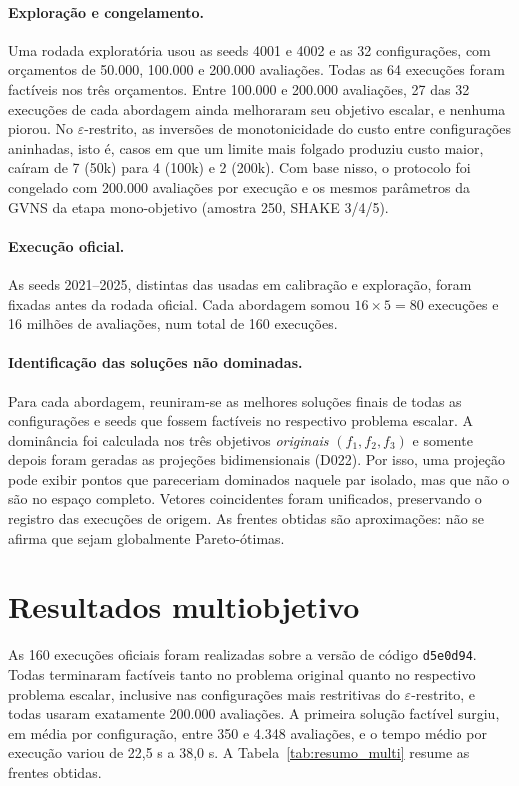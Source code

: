 \documentclass[10pt,twocolumn,a4paper]{article}
\begin{document}
\paragraph{Exploração e congelamento.} Uma rodada exploratória usou as seeds 4001 e 4002 e as 32 configurações, com orçamentos de 50.000, 100.000 e 200.000 avaliações. Todas as 64 execuções foram factíveis nos três orçamentos. Entre 100.000 e 200.000 avaliações, 27 das 32 execuções de cada abordagem ainda melhoraram seu objetivo escalar, e nenhuma piorou. No $\varepsilon$-restrito, as inversões de monotonicidade do custo entre configurações aninhadas, isto é, casos em que um limite mais folgado produziu custo maior, caíram de 7 (50k) para 4 (100k) e 2 (200k). Com base nisso, o protocolo foi congelado com 200.000 avaliações por execução e os mesmos parâmetros da GVNS da etapa mono-objetivo (amostra 250, SHAKE 3/4/5).

\paragraph{Execução oficial.} As seeds 2021--2025, distintas das usadas em calibração e exploração, foram fixadas antes da rodada oficial. Cada abordagem somou $16 \times 5 = 80$ execuções e 16 milhões de avaliações, num total de 160 execuções.

\paragraph{Identificação das soluções não dominadas.} Para cada abordagem, reuniram-se as melhores soluções finais de todas as configurações e seeds que fossem factíveis no respectivo problema escalar. A dominância foi calculada nos três objetivos \emph{originais} $(f_1, f_2, f_3)$ e somente depois foram geradas as projeções bidimensionais (D022). Por isso, uma projeção pode exibir pontos que pareceriam dominados naquele par isolado, mas que não o são no espaço completo. Vetores coincidentes foram unificados, preservando o registro das execuções de origem. As frentes obtidas são aproximações: não se afirma que sejam globalmente Pareto-ótimas.

\section{Resultados multiobjetivo}
\label{sec:resultados_multi}

As 160 execuções oficiais foram realizadas sobre a versão de código \texttt{d5e0d94}. Todas terminaram factíveis tanto no problema original quanto no respectivo problema escalar, inclusive nas configurações mais restritivas do $\varepsilon$-restrito, e todas usaram exatamente 200.000 avaliações. A primeira solução factível surgiu, em média por configuração, entre 350 e 4.348 avaliações, e o tempo médio por execução variou de 22,5 s a 38,0 s. A Tabela~\ref{tab:resumo_multi} resume as frentes obtidas.
\end{document}
